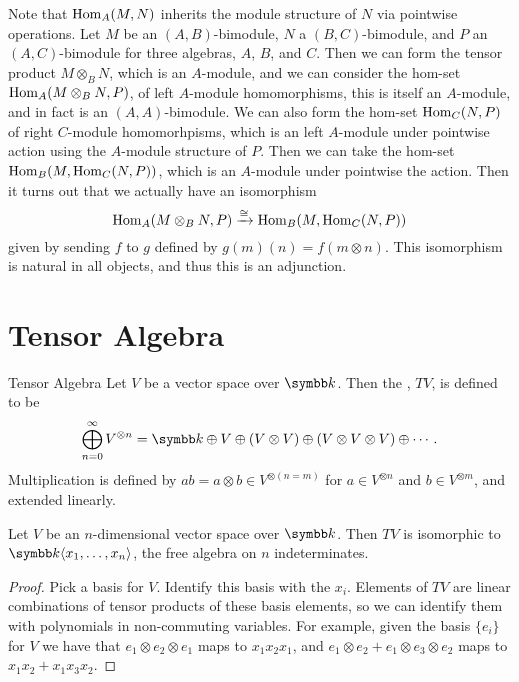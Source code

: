 Note that \(\operatorname{Hom}_A(M, N)\) inherits the module structure of \(N\) via pointwise operations.
Let \(M\) be an \((A, B)\)-bimodule, \(N\) a \((B, C)\)-bimodule, and \(P\) an \((A, C)\)-bimodule for three algebras, \(A\), \(B\), and \(C\).
Then we can form the tensor product \(M \otimes_B N\), which is an \(A\)-module, and we can consider the hom-set \(\operatorname{Hom}_A(M \otimes_B N, P)\), of left \(A\)-module homomorphisms, this is itself an \(A\)-module, and in fact is an \((A, A)\)-bimodule.
We can also form the hom-set \(\operatorname{Hom}_C(N, P)\) of right \(C\)-module homomorhpisms, which is an left \(A\)-module under pointwise action using the \(A\)-module structure of \(P\).
Then we can take the hom-set \(\operatorname{Hom}_B(M, \operatorname{Hom}_C(N, P))\), which is an \(A\)-module under pointwise the action.
Then it turns out that we actually have an isomorphism
\begin{equation}
    \operatorname{Hom}_A(M \otimes_B N, P) \xrightarrow{\cong} \operatorname{Hom}_B(M, \operatorname{Hom}_C(N, P))
\end{equation}
given by sending \(f\) to \(g\) defined by \(g(m)(n) = f(m \otimes n)\).
This isomorphism is natural in all objects, and thus this is an adjunction.

\section{Tensor Algebra}
\begin{dfn}{Tensor Algebra}{}
    Let \(V\) be a vector space over \(\field\).
    Then the , \(TV\), is defined to be
    \begin{equation}
        \bigoplus_{n=0}^{\infty} V^{\otimes n} = \field \oplus V \oplus (V \otimes V) \oplus (V \otimes V \otimes V) \oplus \dotsb.
    \end{equation}
    Multiplication is defined by \(ab = a \otimes b \in V^{\otimes(n = m)}\) for \(a \in V^{\otimes n}\) and \(b \in V^{\otimes m}\), and extended linearly.
\end{dfn}

\begin{lma}{}{}
    Let \(V\) be an \(n\)-dimensional vector space over \(\field\).
    Then \(TV\) is isomorphic to \(\field\langle x_1, \dotsc, x_n \rangle\), the free algebra on \(n\) indeterminates.
    \begin{proof}
        Pick a basis for \(V\).
        Identify this basis with the \(x_i\).
        Elements of \(TV\) are linear combinations of tensor products of these basis elements, so we can identify them with polynomials in non-commuting variables.
        For example, given the basis \(\{e_i\}\) for \(V\) we have that \(e_1 \otimes e_2 \otimes e_1\) maps to \(x_1x_2x_1\), and \(e_1 \otimes e_2 + e_1 \otimes e_3 \otimes e_2\) maps to \(x_1x_2 + x_1x_3x_2\).
    \end{proof}
\end{lma}

